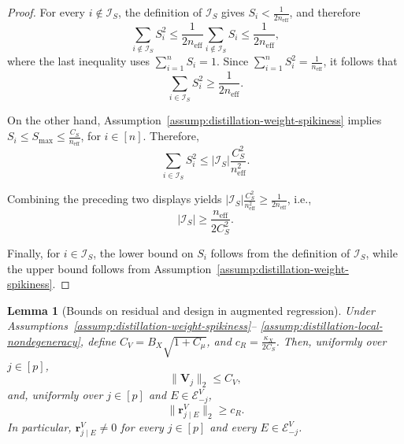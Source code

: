 \documentclass[12pt]{article}
\newtheorem{lemma}{Lemma}
\theoremstyle{definition}
\begin{document}
\begin{proof}
For every $i\notin\mathcal I_S$, the definition of
$\mathcal I_S$ gives $S_i<\frac{1}{2n_{\mathrm{eff}}}$, and therefore
\[
    \sum_{i\notin\mathcal I_S}S_i^2
    \le
    \frac{1}{2n_{\mathrm{eff}}}
    \sum_{i\notin\mathcal I_S}S_i
    \le
    \frac{1}{2n_{\mathrm{eff}}},
\]
where the last inequality uses
$\sum_{i=1}^nS_i=1$. 
Since $\sum_{i=1}^nS_i^2=\frac{1}{n_{\mathrm{eff}}}$,
it follows that
\[
    \sum_{i\in\mathcal I_S}S_i^2
    \ge
    \frac{1}{2n_{\mathrm{eff}}}.
\]

On the other hand, Assumption~\ref{assump:distillation-weight-spikiness} implies
$S_i\le S_{\max}\le\frac{C_S}{n_{\mathrm{eff}}}$, for $i\in[n]$.
Therefore, 
$$\sum_{i\in\mathcal I_S}S_i^2\le |\mathcal I_S| \frac{C_S^2}{n_{\mathrm{eff}}^2}.$$

Combining the preceding two displays yields $|\mathcal I_S|
    \frac{C_S^2}{n_{\mathrm{eff}}^2}
    \ge
    \frac{1}{2n_{\mathrm{eff}}}$, i.e.,
\[
    |\mathcal I_S|
    \ge
    \frac{n_{\mathrm{eff}}}{2C_S^2}.
\]

Finally, for $i\in\mathcal I_S$, the lower bound on $S_i$ follows
from the definition of $\mathcal I_S$, while the upper bound follows
from
Assumption~\ref{assump:distillation-weight-spikiness}.
\end{proof}

\begin{lemma}[Bounds on residual and design in augmented regression]
\label{lem:distillation-augmented-residual-geometry}
Under
Assumptions~\ref{assump:distillation-weight-spikiness}--%
\ref{assump:distillation-local-nondegeneracy}, define
$C_V =B_X\sqrt{1+C_\mu}$, and $c_R=\frac{\kappa_X}{2C_S}$.
Then, uniformly over $j\in[p]$,
\[
    \|\boldsymbol V_j\|_2\le C_V,
\]
and, uniformly over $j\in[p]$ and
$E\in\mathcal E_{-j}^V$,
\[
    \|\boldsymbol r_{j\mid E}^V\|_2\ge c_R.
\]
In particular, $\boldsymbol r_{j\mid E}^V\ne0$ for every $j\in[p]$ and every
$E\in\mathcal E_{-j}^V$.
\end{lemma}
\end{document}
